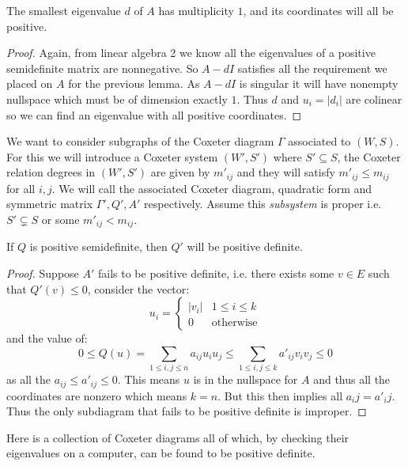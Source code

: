 \documentclass[../main.tex]{subfiles}
\begin{document}
\begin{lemma}
    The smallest eigenvalue $d$ of $A$ has multiplicity $1$, and its coordinates will all be positive.
    \begin{proof}
        Again, from linear algebra 2 we know all the eigenvalues of a positive semidefinite matrix are nonnegative. So $A-dI$ satisfies all the requirement we placed on $A$ for the previous lemma. As $A-dI$ is singular it will have nonempty nullspace which must be of dimension exactly $1$. Thus $d$ and $u_i = |d_i|$ are colinear so we can find an eigenvalue with all positive coordinates.
    \end{proof}
\end{lemma}

We want to consider subgraphs of the Coxeter diagram $\Gamma$ associated to $(W,S)$. For this we will introduce a Coxeter system $(W',S')$ where $S'\subseteq S$, the Coxeter relation degrees in $(W',S')$ are given by $m'_{ij}$ and they will satisfy $m'_{ij}\leq m_{ij}$ for all $i,j$. We will call the associated Coxeter diagram, quadratic form and symmetric matrix $\Gamma', Q', A'$ respectively. Assume this \textit{subsystem} is proper i.e. $S'\subsetneq S$ or some $m'_{ij}<m_{ij}$.

\begin{proposition}
    If $Q$ is positive semidefinite, then $Q'$ will be positive definite.
    \begin{proof}
        Suppose $A'$ fails to be positive definite, i.e. there exists some $v\in E$ such that $Q'(v)\leq 0$, consider the vector:\[
            u_i = \begin{cases}
                |v_i| & 1\leq i \leq k\\
                0 & \text{otherwise}
            \end{cases}
        \] and the value of: \[
        0\leq Q(u) = \sum_{1\leq i,j\leq n} a_{ij}u_i u_j \leq \sum_{1\leq i,j\leq k} a'_{ij}v_i v_j \leq 0
        \] as all the $a_{ij}\leq a'_{ij}\leq 0$. This means $u$ is in the nullspace for $A$ and thus all the coordinates are nonzero which means $k=n$. But this then implies all $a_ij = a'_ij$. Thus the only subdiagram that fails to be positive definite is improper.
    \end{proof}
\end{proposition}

Here is a collection of Coxeter diagrams all of which, by checking their eigenvalues on a computer, can be found to be positive definite.
\end{document}
